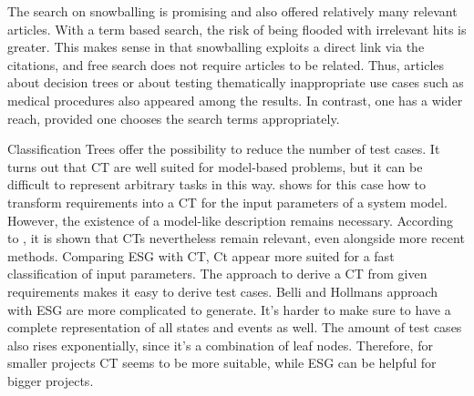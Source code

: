 The search on snowballing is promising and also offered relatively many relevant articles. With a term based search, the risk of being flooded with irrelevant hits is greater. This makes sense in that snowballing exploits a direct link via the citations, and free search does not require articles to be related. Thus, articles about decision trees or about testing thematically inappropriate use cases such as medical procedures also appeared among the results. In contrast, one has a wider reach, provided one chooses the search terms appropriately.

Classification Trees offer the possibility to reduce the number of test cases. It turns out that CT are well suited for model-based problems, but it can be difficult to represent arbitrary tasks in this way.  \cite{Conrad} shows for this case how to transform requirements into a CT for the input parameters of a system model. However, the existence of a model-like description remains necessary. According to \cite{Belli}, it is shown that CTs nevertheless remain relevant, even alongside more recent methods. Comparing ESG with CT, Ct appear more suited for a fast classification of input parameters. The approach to derive a CT from given requirements makes it easy to derive test cases. Belli and Hollmans approach with ESG are more complicated to generate. It's harder to make sure to have a complete representation of all states and events as well. The amount of test cases also rises exponentially, since it's a combination of leaf nodes. Therefore, for smaller projects CT seems to be more suitable, while ESG can be helpful for bigger projects.







